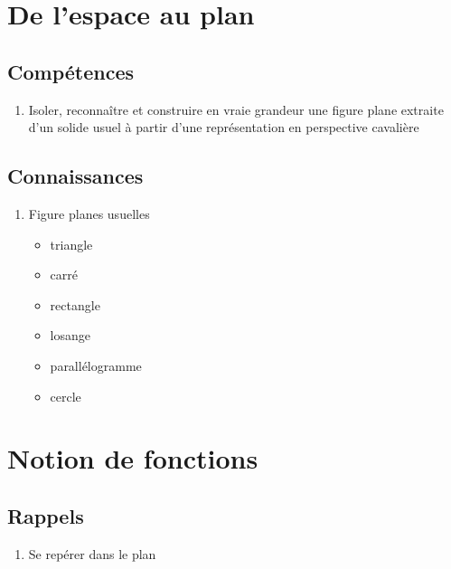 \documentclass[12pt,a4paper]{article}
\begin{document}
\section{De l'espace au plan}
\subsection*{Compétences}
\begin{enumerate}
	\item Isoler, reconnaître et construire en vraie grandeur une figure plane extraite d'un solide usuel à partir d'une représentation en perspective cavalière
	
\end{enumerate}

\subsection*{Connaissances}
\begin{enumerate}
	\item Figure planes usuelles
	\begin{itemize}
		\item triangle
		\item carré
		\item rectangle
		\item losange
		\item parallélogramme
		\item cercle
	\end{itemize}
\end{enumerate}

\section{Notion de fonctions}

\subsection*{Rappels}
\begin{enumerate}
	\item Se repérer dans le plan
\end{enumerate}
\end{document}
